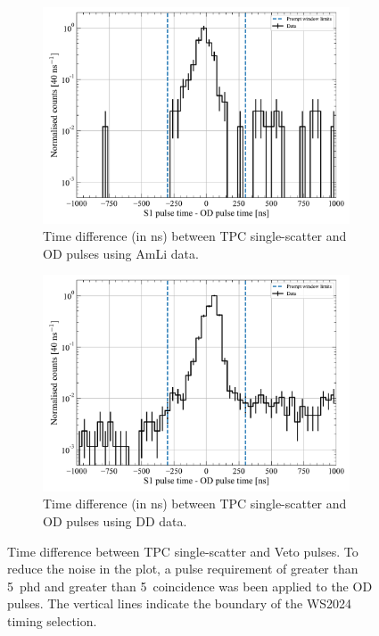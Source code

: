 \begin{figure}[!ht]
	\centering
	\begin{subfigure}[b]{0.48\textwidth}
		\centering
		\includegraphics[width=\textwidth]{figures/VetoEfficiency/ODpromptWindowTiming_AmLi.pdf}
		\caption{Time difference (in ns) between TPC single-scatter and OD pulses using AmLi data.}
		\label{fig:VetoEff/od_prompt_window_AmLi}
	\end{subfigure}
	\hfill
	\begin{subfigure}[b]{0.48\textwidth}
		\centering
		\includegraphics[width=\textwidth]{figures/VetoEfficiency/ODpromptWindowTiming_DD.pdf}
		\caption{Time difference (in ns) between TPC single-scatter and OD pulses using DD data.}
		\label{fig:VetoEff/od_prompt_window_DD}
	\end{subfigure}
	\caption{Time difference between TPC single-scatter and Veto pulses. To reduce the noise in the plot, a pulse requirement of greater than 5~phd and greater than 5~coincidence was been applied to the OD pulses. The vertical lines indicate the boundary of the WS2024 timing selection.}
	\label{fig:VetoEff/veto_prompt_windows_OD}
\end{figure}

